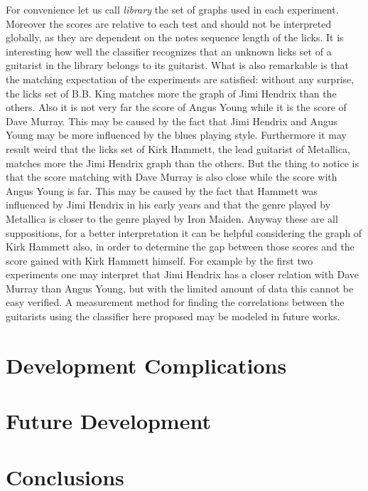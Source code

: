 \documentclass{llncs}
\begin{document}
For convenience let us call
\emph{library} the set of graphs used in each experiment.
Moreover the scores are relative to each test and should not be
interpreted globally, as they are dependent on the notes sequence
length of the licks.
It is interesting how well the classifier recognizes that an unknown
licks set of a guitarist in the library belongs to its guitarist. What
is also remarkable is that the matching expectation of the experiments are 
satisfied: without any surprise, the licks set of B.B. King 
matches more the graph of Jimi Hendrix than the others. Also it is not
very far the score of Angus Young while it is the score of Dave Murray.
This may be caused by the fact that Jimi Hendrix and Angus Young may be
more influenced by the blues playing style. Furthermore it may result
weird that the licks set of
Kirk Hammett, the lead guitarist of Metallica, matches more the Jimi
Hendrix graph than the others. But the thing to notice is that the score
matching with Dave Murray is also close while the score with Angus Young
is far. This may be caused by the fact that Hammett was influenced by
Jimi Hendrix \cite{hammet-hendrix} in his early years and that the genre played by Metallica
is closer to the genre played by Iron Maiden. Anyway these are all
suppositions, for a better interpretation it can be helpful considering the
graph of Kirk Hammett also, in order to determine the gap between those
scores and the score gained with Kirk Hammett himself. For example by the
first two experiments one may interpret that Jimi Hendrix has a closer
relation with Dave Murray than Angus Young, but with the limited amount
of data this cannot be easy verified. A measurement method for finding the
correlations between the guitarists using the classifier here proposed
may be modeled in future works.


\section{Development Complications}

\section{Future Development}


\section{Conclusions}
\end{document}

